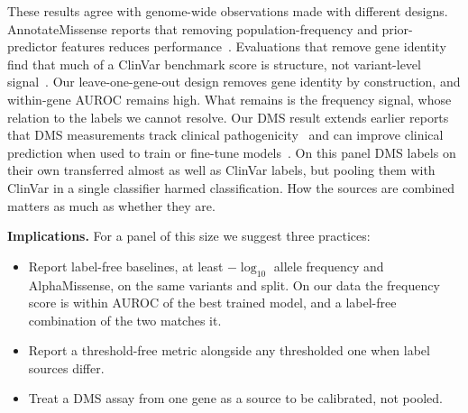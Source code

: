 \documentclass[11pt]{article}
\begin{document}
These results agree with genome-wide observations made with different designs.
AnnotateMissense reports that removing population-frequency and prior-predictor features
reduces performance~\citep{muneeb2026annotatemissense}. Evaluations that remove gene
identity find that much of a ClinVar benchmark score is structure, not variant-level
signal~\citep{harrizi2026geneidentity}. Our leave-one-gene-out design removes gene
identity by construction, and within-gene AUROC remains high. What remains is the
frequency signal, whose relation to the labels we cannot resolve. Our DMS result extends
earlier reports that DMS measurements track clinical pathogenicity~\citep{livesey2020dms}
and can improve clinical prediction when used to train or fine-tune
models~\citep{lafita2024dmsft,jagota2023transfer}. On this panel
DMS labels on their own transferred almost as well as ClinVar labels, but pooling them
with ClinVar in a single classifier harmed classification. How the sources are combined
matters as much as whether they are.

\textbf{Implications.} For a panel of this size we suggest three practices:
\begin{itemize}
\item Report label-free baselines, at least $-\log_{10}$ allele frequency and
  AlphaMissense, on the same variants and split. On our data the frequency score is within
  \dAucMBilstmAttnVsNegLogAfAbs{} AUROC of the best trained model, and a label-free
  combination of the two matches it.
\item Report a threshold-free metric alongside any thresholded one when label sources
  differ.
\item Treat a DMS assay from one gene as a source to be calibrated, not pooled.
\end{itemize}
\end{document}
